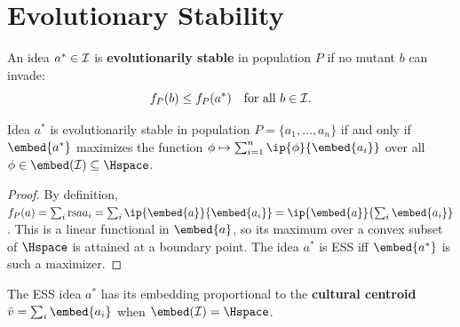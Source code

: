 \section{Evolutionary Stability}

\begin{definition}
\label{def:ess}
An idea $a^* \in \mathcal{I}$ is \textbf{evolutionarily stable} in population $P$ if
no mutant $b$ can invade:
\[
  f_P(b) \leq f_P(a^*) \quad \text{for all } b \in \mathcal{I}.
\]
\end{definition}

\begin{theorem}
\label{thm:ess-characterization}
Idea $a^*$ is evolutionarily stable in population $P = \{a_1, \ldots, a_n\}$
if and only if $\embed{a^*}$ maximizes the function
$\phi \mapsto \sum_{i=1}^{n} \ip{\phi}{\embed{a_i}}$ over all
$\phi \in \embed(\IS) \subseteq \Hspace$.
\end{theorem}

\begin{proof}
By definition, $f_P(a) = \sum_{i} \rs{a}{a_i} = \sum_{i} \ip{\embed{a}}{\embed{a_i}}
= \ip{\embed{a}}{\sum_i \embed{a_i}}$.  This is a linear functional in
$\embed{a}$, so its maximum over a convex subset of $\Hspace$ is attained at a
boundary point.  The idea $a^*$ is ESS iff $\embed{a^*}$ is such a maximizer.
\end{proof}

\begin{corollary}
The ESS idea $a^*$ has its embedding proportional to the \textbf{cultural
centroid} $\bar{v} = \sum_i \embed{a_i}$ when $\embed(\IS) = \Hspace$.
\end{corollary}

